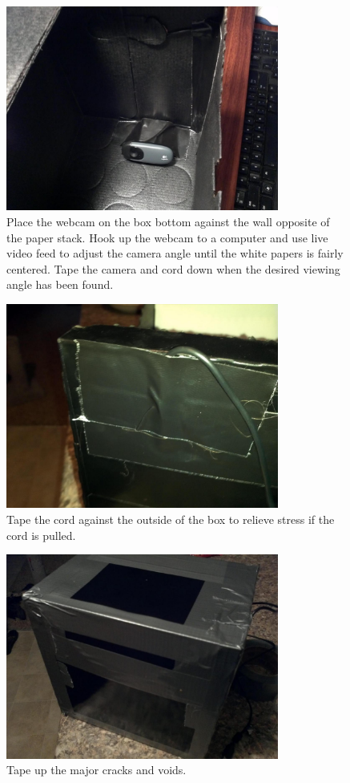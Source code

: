 \documentclass[13pt]{article}
\begin{document}
\begin{figure}[ht!]
\centering
\includegraphics[width=0.8\textwidth]{eps/webcamIn.eps}
\caption{Place the webcam on the box bottom against the wall opposite of the paper stack. Hook up the webcam to a computer and use live video feed to adjust the camera angle until the white papers is fairly centered. Tape the camera and cord down when the desired viewing angle has been found.}
\end{figure}

\begin{figure}[ht!]
\centering
\includegraphics[width=0.8\textwidth]{eps/cordTaped.eps}
\caption{Tape the cord against the outside of the box to relieve stress if the cord is pulled.}
\end{figure}

\begin{figure}[ht!]
\centering
\includegraphics[width=0.8\textwidth]{eps/majorTaped.eps}
\caption{Tape up the major cracks and voids.}
\end{figure}
\end{document}
